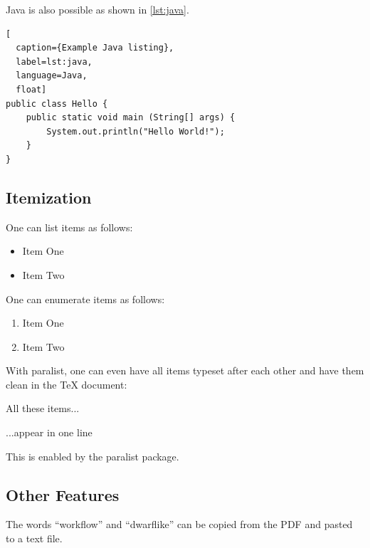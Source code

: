 Java is also possible as shown in \cref{lst:java}.

\begin{ltgexample}
\begin{lstlisting}[
  caption={Example Java listing},
  label=lst:java,
  language=Java,
  float]
public class Hello {
    public static void main (String[] args) {
        System.out.println("Hello World!");
    }
}
\end{lstlisting}
\end{ltgexample}

\subsection{Itemization}

One can list items as follows:

\begin{ltgexample}
\begin{itemize}
  \item Item One
  \item Item Two
\end{itemize}
\end{ltgexample}


One can enumerate items as follows:

\begin{ltgexample}
\begin{enumerate}
  \item Item One
  \item Item Two
\end{enumerate}
\end{ltgexample}


With paralist, one can even have all items typeset after each other and have them clean in the TeX document:

\begin{ltgexample}
\begin{inparaenum}
  \item All these items...
  \item ...appear in one line
  \item This is enabled by the paralist package.
\end{inparaenum}
\end{ltgexample}

\subsection{Other Features}

\begin{ltgexample}
The words \enquote{workflow} and \enquote{dwarflike} can be copied from the PDF and pasted to a text file.
\end{ltgexample}

